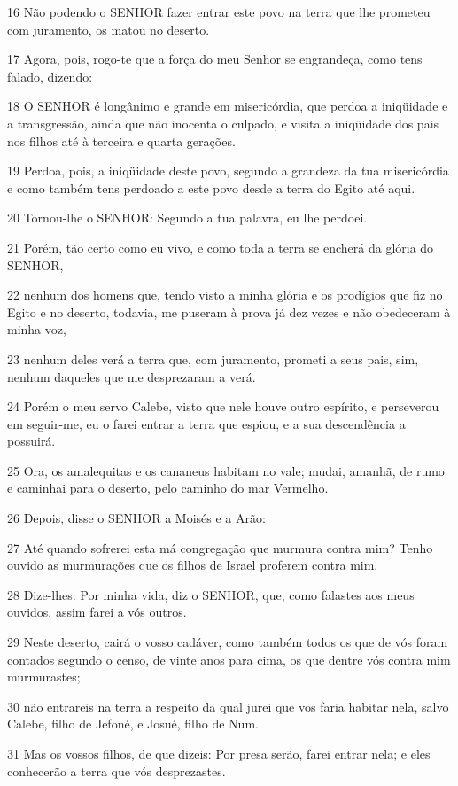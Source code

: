 \par 16 Não podendo o SENHOR fazer entrar este povo na terra que lhe prometeu com juramento, os matou no deserto.
\par 17 Agora, pois, rogo-te que a força do meu Senhor se engrandeça, como tens falado, dizendo:
\par 18 O SENHOR é longânimo e grande em misericórdia, que perdoa a iniqüidade e a transgressão, ainda que não inocenta o culpado, e visita a iniqüidade dos pais nos filhos até à terceira e quarta gerações.
\par 19 Perdoa, pois, a iniqüidade deste povo, segundo a grandeza da tua misericórdia e como também tens perdoado a este povo desde a terra do Egito até aqui.
\par 20 Tornou-lhe o SENHOR: Segundo a tua palavra, eu lhe perdoei.
\par 21 Porém, tão certo como eu vivo, e como toda a terra se encherá da glória do SENHOR,
\par 22 nenhum dos homens que, tendo visto a minha glória e os prodígios que fiz no Egito e no deserto, todavia, me puseram à prova já dez vezes e não obedeceram à minha voz,
\par 23 nenhum deles verá a terra que, com juramento, prometi a seus pais, sim, nenhum daqueles que me desprezaram a verá.
\par 24 Porém o meu servo Calebe, visto que nele houve outro espírito, e perseverou em seguir-me, eu o farei entrar a terra que espiou, e a sua descendência a possuirá.
\par 25 Ora, os amalequitas e os cananeus habitam no vale; mudai, amanhã, de rumo e caminhai para o deserto, pelo caminho do mar Vermelho.
\par 26 Depois, disse o SENHOR a Moisés e a Arão:
\par 27 Até quando sofrerei esta má congregação que murmura contra mim? Tenho ouvido as murmurações que os filhos de Israel proferem contra mim.
\par 28 Dize-lhes: Por minha vida, diz o SENHOR, que, como falastes aos meus ouvidos, assim farei a vós outros.
\par 29 Neste deserto, cairá o vosso cadáver, como também todos os que de vós foram contados segundo o censo, de vinte anos para cima, os que dentre vós contra mim murmurastes;
\par 30 não entrareis na terra a respeito da qual jurei que vos faria habitar nela, salvo Calebe, filho de Jefoné, e Josué, filho de Num.
\par 31 Mas os vossos filhos, de que dizeis: Por presa serão, farei entrar nela; e eles conhecerão a terra que vós desprezastes.
